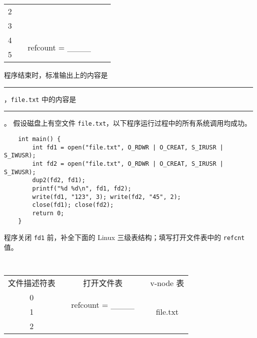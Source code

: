 \begin{problems}
\begin{table}[H]
\begin{tabular}{ccccc}
                \multicolumn{1}{|c|}{2} &  &  & \multicolumn{1}{c|}{} & \multicolumn{1}{c|}{} \\ \cline{1-1}
                \multicolumn{1}{|c|}{3} &  &  & \multicolumn{1}{c|}{} & \multicolumn{1}{c|}{} \\ \cline{1-1} \cline{3-3}
                \multicolumn{1}{|c|}{4} & \multicolumn{1}{c|}{} & \multicolumn{1}{c|}{\multirow{2}{*}{refcount = \_\_\_\_}} & \multicolumn{1}{c|}{} & \multicolumn{1}{c|}{} \\ \cline{1-1}
                \multicolumn{1}{|c|}{5} & \multicolumn{1}{c|}{} & \multicolumn{1}{c|}{} & \multicolumn{1}{c|}{} & \multicolumn{1}{c|}{} \\ \cline{1-1} \cline{3-3} \cline{5-5} 
            \end{tabular}
        \end{table}
        \qn 程序结束时，标准输出上的内容是 \rule{3.5cm}{0.25mm}，\verb|file.txt| 中的内容是 \rule{3.5cm}{0.25mm}。
        \pro 假设磁盘上有空文件 \verb|file.txt|，以下程序运行过程中的所有系统调用均成功。
        \begin{verbatim}
    int main() {
        int fd1 = open("file.txt", O_RDWR | O_CREAT, S_IRUSR | S_IWUSR); 
        int fd2 = open("file.txt", O_RDWR | O_CREAT, S_IRUSR | S_IWUSR); 
        dup2(fd2, fd1);
        printf("%d %d\n", fd1, fd2);
        write(fd1, "123", 3); write(fd2, "45", 2);
        close(fd1); close(fd2);
        return 0;
    }
        \end{verbatim}
        \qn 程序关闭 \verb|fd1| 前，补全下面的 Linux 三级表结构；填写打开文件表中的 \verb|refcnt| 值。
        \begin{table}[H]
            \tt
            \centering
            \begin{tabular}{ccccc}
                文件描述符表 & {\qquad \qquad \qquad} & 打开文件表 & {\qquad \qquad \qquad} & v-node 表 \\ \cline{1-1} \cline{3-3} \cline{5-5} 
                \multicolumn{1}{|c|}{0} & \multicolumn{1}{c|}{} & \multicolumn{1}{c|}{\multirow{2}{*}{refcount = \_\_\_\_}} & \multicolumn{1}{c|}{} & \multicolumn{1}{c|}{\multirow{6}{*}{file.txt}} \\ \cline{1-1}
                \multicolumn{1}{|c|}{1} & \multicolumn{1}{c|}{} & \multicolumn{1}{c|}{} & \multicolumn{1}{c|}{} & \multicolumn{1}{c|}{} \\ \cline{1-1} \cline{3-3}
                \multicolumn{1}{|c|}{2} &  &  & \multicolumn{1}{c|}{} & \multicolumn{1}{c|}{} \\ \cline{1-1}

\end{tabular}
\end{table}
\end{problems}
